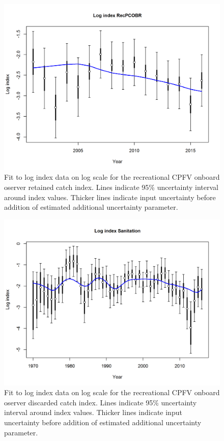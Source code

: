 \documentclass[12pt,]{article}
\begin{document}
\begin{figure}[htbp]
\centering
\includegraphics{r4ss/plots_mod1/index5_logcpuefit_RecPCOBR.png}
\caption{Fit to log index data on log scale for the recreational CPFV
onboard oserver retained catch index. Lines indicate 95\% uncertainty
interval around index values. Thicker lines indicate input uncertainty
before addition of estimated additional uncertainty parameter.
\label{fig:index5_logcpuefit_RecPCOBR}}
\end{figure}

\FloatBarrier

\begin{figure}[htbp]
\centering
\includegraphics{r4ss/plots_mod1/index5_logcpuefit_Sanitation.png}
\caption{Fit to log index data on log scale for the recreational CPFV
onboard oserver discarded catch index. Lines indicate 95\% uncertainty
interval around index values. Thicker lines indicate input uncertainty
before addition of estimated additional uncertainty parameter.
\label{fig:index5_logcpuefit_Sanitation}}
\end{figure}
\end{document}
